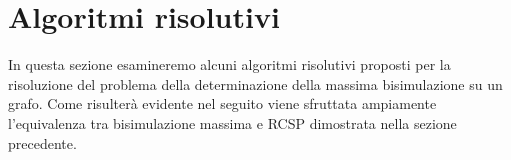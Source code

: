 \section{Algoritmi risolutivi}
\label{sec:algs}
In questa sezione esamineremo alcuni algoritmi risolutivi proposti per la risoluzione del problema della determinazione della massima bisimulazione su un grafo. Come risulterà evidente nel seguito viene sfruttata ampiamente l'equivalenza tra bisimulazione massima e RCSP dimostrata nella sezione precedente.





